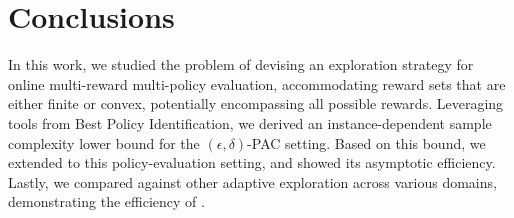 \section{Conclusions}\label{sec:conclusions}   
In this work, we studied  the problem of devising an exploration strategy for online multi-reward multi-policy evaluation, accommodating reward sets that are either finite or convex, potentially encompassing all possible rewards.
Leveraging tools from Best Policy Identification, we derived an instance-dependent sample complexity lower bound for the $(\epsilon,\delta)$-PAC setting. Based on this bound, we extended \mrnas{} \cite{russomulti} to this policy-evaluation setting, and showed its asymptotic efficiency.
Lastly, we compared \mrnas{} against other adaptive exploration  across various domains, demonstrating the efficiency of \mrnas{}.
